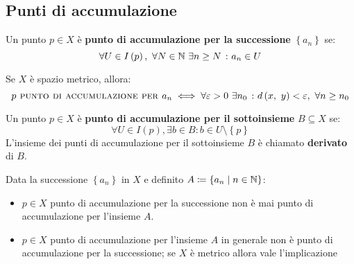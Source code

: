 \subsection{Punti di accumulazione}
\begin{define}
	Un punto $p\in X$ è \textbf{punto di accumulazione per la successione} $\left\{a_n\right\}$ se:
	\begin{equation}
		\forall U\in I\left(p\right),\ \forall N\in\mathbb{N}\ \exists n\geq N\ \colon a_n\in U
	\end{equation}
\vspace{-6mm}
\end{define}
\begin{exercise}
	Se $X$ è spazio metrico, allora:
	\begin{equation}
		p\textsc{ punto di accumulazione per } a_n\iff \forall \epsilon>0\ \exists n_0\ \colon \mvf{d}{x}{y}<\epsilon,\ \forall n\geq n_0
	\end{equation}
\end{exercise}
\vspace{-6mm}
\begin{define}
	Un punto $p\in X$ è \textbf{punto di accumulazione per il sottoinsieme} $B\subseteq X$ se:
	\begin{equation}
		\forall U\in I\left(p\right), \exists b\in B \colon b\in U\setminus \left\{ p\right\}
	\end{equation}
L'insieme dei punti di accumulazione per il sottoinsieme $B$ è chiamato \textbf{derivato} di $B$.
\end{define}
\begin{exercise}
Data la successione $\left\{a_n\right\}$ in $X$ e definito $A\coloneqq \{a_n\mid n\in\mathbb{N}\}$:
\begin{itemize}
\item $p\in X$ punto di accumulazione per la successione non è mai punto di accumulazione per l'insieme $A$.
\item $p\in X$ punto di accumulazione per l'insieme $A$ in generale non è punto di accumulazione per la successione; se $X$ è metrico %
allora vale l'implicazione
\end{itemize}
\end{exercise}
